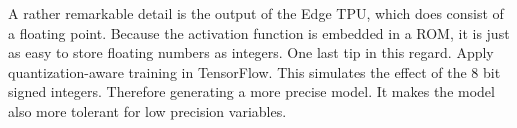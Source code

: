 A rather remarkable detail is the output of the Edge TPU, which does consist of a floating point.
Because the activation function is embedded in a ROM, it is just as easy to store floating numbers as integers.
One last tip in this regard. Apply quantization-aware training in TensorFlow. This simulates the effect of the 8 bit signed integers. Therefore generating a more precise model. It makes the model also more tolerant for low precision variables.